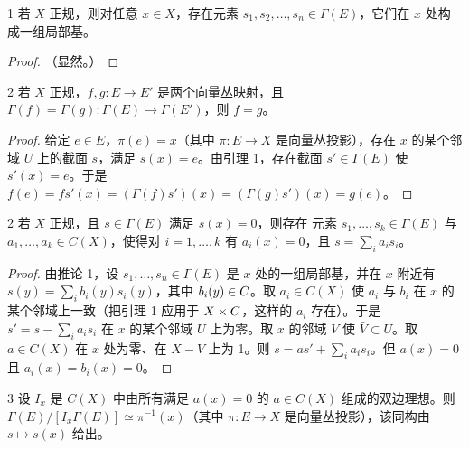 \begin{cor}{1} 若 $X$ 正规，则对任意 $x \in X$，存在元素 $s_1, s_2, \dots, s_n \in \Gamma(E)$，它们在 $x$ 处构成一组局部基。\end{cor}

\begin{proof} （显然。）\end{proof}

\begin{cor}{2} 若 $X$ 正规，$f, g : E \to E'$ 是两个向量丛映射，且 $\Gamma(f) = \Gamma(g) : \Gamma(E) \to \Gamma(E')$，则 $f = g$。\end{cor}

\begin{proof} 给定 $e \in E$，$\pi(e) = x$（其中 $\pi : E \to X$ 是向量丛投影），存在 $x$ 的某个邻域 $U$ 上的截面 $s$，满足 $s(x) = e$。由引理 1，存在截面 $s' \in \Gamma(E)$ 使 $s'(x) = e$。于是 $f(e) = fs'(x) = (\Gamma(f)s')(x) = (\Gamma(g)s')(x) = g(e)$。\end{proof}

\begin{lem}{2} 若 $X$ 正规，且 $s \in \Gamma(E)$ 满足 $s(x) = 0$，则存在
元素 $s_1, \dots, s_k \in \Gamma(E)$ 与 $a_1, \dots, a_k \in C(X)$，使得对 $i = 1, \dots, k$ 有 $a_i(x) = 0$，且 $s = \sum_i a_i s_i$。\end{lem}

\begin{proof} 由推论 1，设 $s_1, \dots, s_n \in \Gamma(E)$ 是 $x$ 处的一组局部基，并在 $x$ 附近有 $s(y) = \sum_i b_i(y)s_i(y)$，其中 $b_i(y) \in C$。取 $a_i \in C(X)$ 使 $a_i$ 与 $b_i$ 在 $x$ 的某个邻域上一致（把引理 1 应用于 $X \times C$，这样的 $a_i$ 存在）。于是 $s' = s - \sum_i a_i s_i$ 在 $x$ 的某个邻域 $U$ 上为零。取 $x$ 的邻域 $V$ 使 $\bar V \subset U$。取 $a \in C(X)$ 在 $x$ 处为零、在 $X - V$ 上为 1。则 $s = as' + \sum_i a_i s_i$。但 $a(x) = 0$ 且 $a_i(x) = b_i(x) = 0$。\end{proof}

\begin{cor}{3} 设 $I_x$ 是 $C(X)$ 中由所有满足 $a(x) = 0$ 的 $a \in C(X)$ 组成的双边理想。则 $\Gamma(E)/[I_x\Gamma(E)] \simeq \pi^{-1}(x)$（其中 $\pi : E \to X$ 是向量丛投影），该同构由 $s \mapsto s(x)$ 给出。\end{cor}

